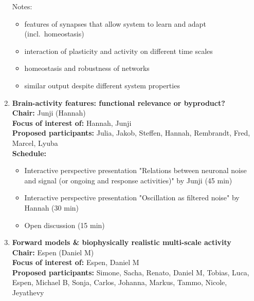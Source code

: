 \documentclass[10pt, a4paper,twoside,american]{article}
\begin{document}
\begin{enumerate}[resume]
  Notes:
  \begin{itemize}
  \item features of synapses that allow system to learn and adapt (incl.~homeostasis) 
  \item interaction of plasticity and activity on different time scales 
  \item homeostasis and robustness of networks
  \item similar output despite different system properties
  \end{itemize}
\item {\large\bf Brain-activity features: functional relevance or byproduct?}\\[1ex]
  {\bf Chair:} Junji (Hannah)\\[1ex]
  {\bf Focus of interest of:} Hannah, Junji\\[1ex]
  {\bf Proposed participants:} Julia, Jakob, Steffen, Hannah, Rembrandt, Fred, Marcel, Lyuba\\[1ex]
  {\bf Schedule:}
  \begin{itemize}
  \item Interactive perspective presentation "Relations between neuronal noise and signal (or ongoing and response activities)" by Junji (45 min)
  \item Interactive perspective presentation "Oscillation as filtered noise" by Hannah (30 min)
  \item Open discussion (15 min)
  \end{itemize}
\item {\large\bf Forward models \& biophysically realistic multi-scale activity}\\[1ex]
  {\bf Chair:} Espen (Daniel M)\\[1ex]
  {\bf Focus of interest of:} Espen, Daniel M\\[1ex]
  {\bf Proposed participants:} Simone, Sacha, Renato, Daniel M, Tobias, Luca, Espen, Michael B, Sonja, Carlos, Johanna, Markus, Tammo, Nicole, Jeyathevy\\[1ex]

\end{enumerate}
\end{document}
